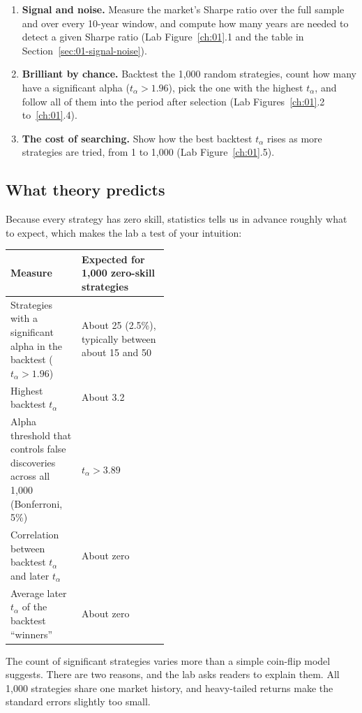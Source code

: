 \begin{enumerate}
  \item \textbf{Signal and noise.} Measure the market's Sharpe ratio over the full sample and over every 10-year window, and compute how many years are needed to detect a given Sharpe ratio (Lab Figure~\ref{ch:01}.1 and the table in Section~\ref{sec:01-signal-noise}).
  \item \textbf{Brilliant by chance.} Backtest the 1,000 random strategies, count how many have a significant alpha ($t_\alpha > 1.96$), pick the one with the highest $t_\alpha$, and follow all of them into the period after selection (Lab Figures~\ref{ch:01}.2 to~\ref{ch:01}.4).
  \item \textbf{The cost of searching.} Show how the best backtest $t_\alpha$ rises as more strategies are tried, from 1 to 1,000 (Lab Figure~\ref{ch:01}.5).
\end{enumerate}

\subsection*{What theory predicts}

Because every strategy has zero skill, statistics tells us in advance roughly what to expect, which makes the lab a test of your intuition:

\begin{center}
\small
\begin{tabularx}{0.9\linewidth}{@{}>{\raggedright\arraybackslash}p{0.450\linewidth}>{\raggedright\arraybackslash}X@{}}
\toprule
Measure & Expected for 1,000 zero-skill strategies \\
\midrule
Strategies with a significant alpha in the backtest ($t_\alpha > 1.96$) & About 25 (2.5\%), typically between about 15 and 50 \\
Highest backtest $t_\alpha$ & About 3.2 \\
Alpha threshold that controls false discoveries across all 1,000 (Bonferroni, 5\%) & $t_\alpha > 3.89$ \\
Correlation between backtest $t_\alpha$ and later $t_\alpha$ & About zero \\
Average later $t_\alpha$ of the backtest ``winners'' & About zero \\
\bottomrule
\end{tabularx}
\end{center}

The count of significant strategies varies more than a simple coin-flip model suggests. There are two reasons, and the lab asks readers to explain them. All 1,000 strategies share one market history, and heavy-tailed returns make the standard errors slightly too small.

